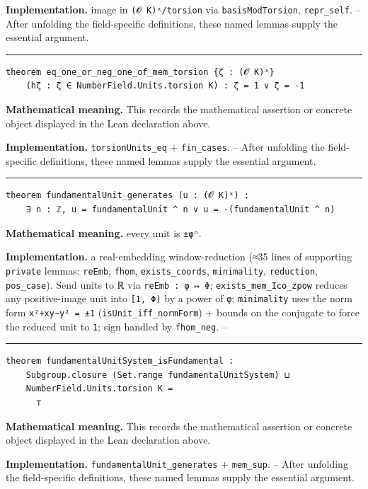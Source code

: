 \documentclass[UTF8,a4paper,11pt,fontset=fandol]{ctexart}
\theoremstyle{definition}
\newcommand{\statementsep}{\par\medskip\hrule\medskip}
\begin{document}
\noindent\textbf{Implementation.} image in \texttt{(𝓞 K)ˣ/\allowbreak{}torsion} via \texttt{basisModTorsion}, \texttt{repr\_\allowbreak{}self}. -- After unfolding the field-specific definitions, these named lemmas supply the essential argument.\par
\statementsep
\begin{verbatim}
theorem eq_one_or_neg_one_of_mem_torsion {ζ : (𝓞 K)ˣ}
    (hζ : ζ ∈ NumberField.Units.torsion K) : ζ = 1 ∨ ζ = -1
\end{verbatim}
\noindent\textbf{Mathematical meaning.} This records the mathematical assertion or concrete object displayed in the Lean declaration above.\par
\noindent\textbf{Implementation.} \texttt{torsionUnits\_\allowbreak{}eq} + \texttt{fin\_\allowbreak{}cases}. -- After unfolding the field-specific definitions, these named lemmas supply the essential argument.\par
\statementsep
\begin{verbatim}
theorem fundamentalUnit_generates (u : (𝓞 K)ˣ) :
    ∃ n : ℤ, u = fundamentalUnit ^ n ∨ u = -(fundamentalUnit ^ n)
\end{verbatim}
\noindent\textbf{Mathematical meaning.} every unit is \texttt{±φⁿ}.\par
\noindent\textbf{Implementation.} a real-embedding window-reduction (≈35 lines of supporting \texttt{private} lemmas: \texttt{reEmb}, \texttt{fhom}, \texttt{exists\_\allowbreak{}coords}, \texttt{minimality}, \texttt{reduction}, \texttt{pos\_\allowbreak{}case}). Send units to ℝ via \texttt{reEmb : φ ↦ Φ}; \texttt{exists\_\allowbreak{}mem\_\allowbreak{}Ico\_\allowbreak{}zpow} reduces any positive-image unit into \texttt{[1, Φ)} by a power of \texttt{φ}; \texttt{minimality} uses the norm form \texttt{x²+xy−y² = ±1} (\texttt{isUnit\_\allowbreak{}iff\_\allowbreak{}normForm}) + bounds on the conjugate to force the reduced unit to \texttt{1}; sign handled by \texttt{fhom\_\allowbreak{}neg}. --\par
\statementsep
\begin{verbatim}
theorem fundamentalUnitSystem_isFundamental :
    Subgroup.closure (Set.range fundamentalUnitSystem) ⊔
    NumberField.Units.torsion K =
      ⊤
\end{verbatim}
\noindent\textbf{Mathematical meaning.} This records the mathematical assertion or concrete object displayed in the Lean declaration above.\par
\noindent\textbf{Implementation.} \texttt{fundamentalUnit\_\allowbreak{}generates} + \texttt{mem\_\allowbreak{}sup}. -- After unfolding the field-specific definitions, these named lemmas supply the essential argument.\par
\end{document}
